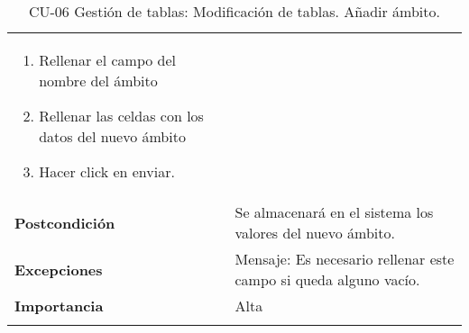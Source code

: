 \begin{longtable}[H]{@{}ll@{}}
\begin{minipage}[t]{0.71\columnwidth}
\begin{enumerate}
\item 
Rellenar el campo del nombre del ámbito
\item
Rellenar las celdas con los datos del nuevo ámbito
\item
Hacer click en enviar.
\end{enumerate}\strut
\end{minipage}\tabularnewline
\begin{minipage}[t]{0.23\columnwidth}\raggedright\strut
\textbf{Postcondición}\strut
\end{minipage} & \begin{minipage}[t]{0.71\columnwidth}\raggedright\strut
Se almacenará en el sistema los valores del nuevo ámbito.\strut
\end{minipage}\tabularnewline
\begin{minipage}[t]{0.23\columnwidth}\raggedright\strut
\textbf{Excepciones}\strut
\end{minipage} & \begin{minipage}[t]{0.71\columnwidth}\raggedright\strut
Mensaje: Es necesario rellenar este campo si queda alguno vacío. \strut
\end{minipage}\tabularnewline
\begin{minipage}[t]{0.23\columnwidth}\raggedright\strut
\textbf{Importancia}\strut
\end{minipage} & \begin{minipage}[t]{0.71\columnwidth}\raggedright\strut
Alta\strut
\end{minipage}\tabularnewline
\bottomrule
\caption{CU-06 Gestión de tablas: Modificación de tablas. Añadir ámbito.}
\end{longtable}

